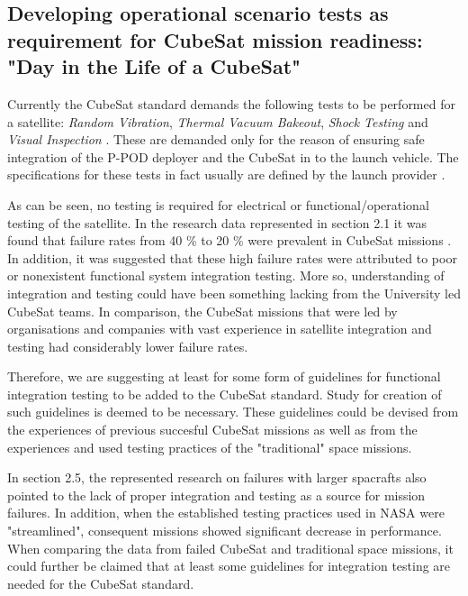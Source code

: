 \documentclass[english,12pt,a4paper,pdftex,elec,utf8]{aaltothesis}
\begin{document}
\subsection{Developing operational scenario tests as requirement for CubeSat mission readiness: "Day in the Life of a CubeSat"}
Currently the CubeSat standard demands the following tests to be performed for a satellite: \textit{Random Vibration}, \textit{Thermal Vacuum Bakeout}, \textit{Shock Testing} and \textit{Visual Inspection} \cite{cds}. These are demanded only for the reason of ensuring safe integration of the P-POD deployer and the CubeSat in to the launch vehicle. The specifications for these tests in fact usually are defined by the launch provider \cite{cds}.\par 
As can be seen, no testing is required for electrical or functional/operational testing of the satellite. In the research data represented in section 2.1 it was found that failure rates from 40 \% to 20 \% were prevalent in CubeSat missions \cite{Swart1, Swart2016, Swart2015}. In addition, it was suggested that these high failure rates were attributed to poor or nonexistent functional system integration testing. More so, understanding of integration and testing could have been something lacking from the University led CubeSat teams. In comparison, the CubeSat missions that were led by organisations and companies with vast experience in satellite integration and testing had considerably lower failure rates.\par 
Therefore, we are suggesting at least for some form of guidelines for functional integration testing to be added to the CubeSat standard. Study for creation of such guidelines is deemed to be necessary. These guidelines could be devised from the experiences of previous succesful CubeSat missions as well as from the experiences and used testing practices of the "traditional" space missions.\par
In section 2.5, the represented research on failures with larger spacrafts also pointed to the lack of proper integration and testing as a source for mission failures. In addition, when the established testing practices used in NASA were "streamlined", consequent missions showed significant decrease in performance. When comparing the data from failed CubeSat and traditional space missions, it could further be claimed that at least some guidelines for integration testing are needed for the CubeSat standard. \par
\end{document}
